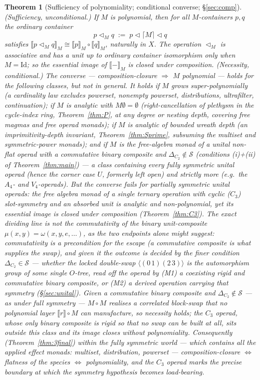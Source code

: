 \documentclass[11pt]{amsart}
\theoremstyle{plain}
\newtheorem{theorem}{Theorem}[section]
\theoremstyle{definition}
\newcommand{\ext}[1]{\llbracket #1 \rrbracket}
\newcommand{\extM}[1]{\llbracket #1 \rrbracket_{M}}
\newcommand{\Id}{\mathrm{Id}}
\newcommand{\ceil}[1]{\lceil #1 \rceil}
\begin{document}
\begin{theorem}[Sufficiency of polynomiality; conditional converse; \S\ref{sec:comp}]\label{thm:3}
\emph{(Sufficiency, unconditional.)} If $M$ is polynomial, then for all $M$-containers $p,q$ the
ordinary container
\[
  p\triangleleft_M q\;:=\;p\triangleleft\ceil M\triangleleft q
\]
satisfies $\extM{p\triangleleft_M q}\cong\extM{p}\circ\extM{q}$, naturally in $X$. The operation
$\triangleleft_M$ is associative and has a unit up to ordinary container isomorphism only when
$M=\Id$; so the essential image of $\extM{-}$ is closed under composition.
\emph{(Necessity, conditional.)} The converse --- composition-closure $\Rightarrow$ $M$ polynomial ---
holds for the following classes, but not in general. It holds if $M$ grows super-polynomially (a
cardinality law excludes powerset, nonempty powerset, distributions, ultrafilter, continuation); if $M$
is analytic with $M\emptyset=\emptyset$ (right-cancellation of plethysm in the cycle-index ring,
Theorem~\ref{thm:P}, at any degree or nesting depth, covering free magmas and free operad monads); if
$M$ is analytic of bounded \emph{wreath depth} (an imprimitivity-depth invariant, Theorem~\ref{thm:Sprime},
subsuming the multiset and symmetric-power monads); and if $M$ is the free-algebra monad of a unital
non-flat operad with a \emph{commutative binary composite} and $\Delta_{C_2}\notin\mathcal S$
(conditions (i)+(ii) of Theorem~\ref{thm:main}) --- a class containing every fully symmetric unital operad
(hence the corner case $U$, formerly left open) and strictly more (e.g.\ the $A_4$- and $V_4$-operads).
\emph{But the converse fails} for partially symmetric unital operads: the free algebra monad of a single
ternary operation with cyclic ($C_3$) slot-symmetry and an absorbed unit is analytic and non-polynomial,
yet its essential image \emph{is} closed under composition (Theorem~\ref{thm:C3}). The exact dividing line
is \emph{not} the commutativity of the binary unit-composite $\mu(x,y)=\omega(x,y,e,\dots)$, as the two
endpoints alone might suggest: commutativity is a \emph{precondition} for the escape (a commutative
composite is what supplies the swap), and given it the outcome is decided by the finer condition
$\Delta_{C_2}\in\mathcal S$ --- whether the locked double-swap $\langle(0\,1)(2\,3)\rangle$ is the
automorphism group of some single $O$-tree, read off the operad by (M1) a coexisting rigid \emph{and}
commutative binary composite, or (M2) a derived operation carrying that symmetry (\S\ref{sec:unital}).
Given a commutative binary composite and $\Delta_{C_2}\notin\mathcal S$ --- as under full symmetry ---
$M\circ M$ realises a correlated block-swap that no polynomial layer $\ext r\circ M$ can manufacture, so
necessity holds; the $C_3$ operad, whose only binary composite is rigid so that no swap can be built at
all, sits outside this class and its image closes without polynomiality. Consequently
\textup{(}Theorem~\ref{thm:3final}\textup{)} \emph{within the fully
symmetric world --- which contains all the applied effect monads: multiset, distribution, powerset ---
composition-closure $\iff$ flatness of the species $\iff$ polynomiality}, and the $C_3$ operad marks the
precise boundary at which the symmetry hypothesis becomes load-bearing.
\end{theorem}
\end{document}
